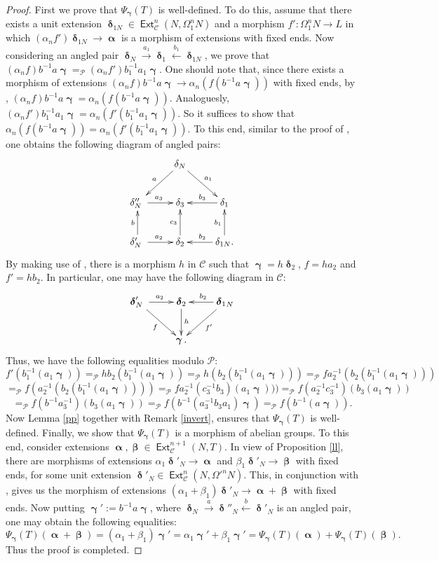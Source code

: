 \documentclass[11pt,a4paper]{amsart}
\newcommand{\rt}{\rightarrow}
\newcommand{\lrt}{\longrightarrow}
\newcommand{\lf}{\leftarrow}
\newcommand{\st}{\stackrel}
\newcommand{\C}{\mathscr{C} }
\newcommand{\p}{\mathfrak{p} }
\def\Ext{\operatorname{{\mathsf{Ext}}}}
\def\syz{\mathsf{\Omega}}
\def\p{\mathcal P}
\def\al{\operatorname{\boldsymbol{\alpha}}}
\def\be{\operatorname{\boldsymbol{\beta}}}
\def\ga{\operatorname{\boldsymbol{\gamma}}}
\def\de{\operatorname{\boldsymbol{\delta}}}
\theoremstyle{definition}
\theoremstyle{plain}
\theoremstyle{definition}
\numberwithin{equation}{section}
\begin{document}
\begin{proof}First we prove that $\Psi_{\ga}(T)$ is well-defined. To do this, assume that there exists a unit extension $\de_{1N}\in\Ext^n_{\C}(N, \syz^n_1N)$ and a morphism $f':\syz^n_1N\rt L$ in which $(\alpha_nf')\de_{1N}\lrt\al$ is a morphism of extensions with fixed ends. Now considering an angled pair $\de_N\st{a_1}\rt\de_1\st{b_1}\lf\de_{1N}$, we prove that $(\alpha_nf)b^{-1}a\ga=_{\p}(\alpha_nf')b_1^{-1}a_1\ga$. One should note that, since there exists a morphism of extensions $(\alpha_nf)b^{-1}a\ga\lrt\alpha_n(f(b^{-1}a\ga))$ with fixed ends, by \cite[Chapter VII, Proposition 3.1]{mit}, $(\alpha_nf)b^{-1}a\ga=\alpha_n(f(b^{-1}a\ga))$. Analoguesly,  $(\alpha_nf')b_1^{-1}a_1\ga=\alpha_n(f'(b_1^{-1}a_1\ga))$. So it suffices to show that  $\alpha_n(f(b^{-1}a\ga))=\alpha_n(f'(b_1^{-1}a_1\ga))$. To this end, similar to the proof of  \cite[Theorem 7.4]{bfss}, one obtains the following diagram of angled pairs:
{\footnotesize \[\xymatrix{&\delta_N\ar[dl]_{a}\ar[dr]^{a_1}& \\ \delta''_{N}~\ar[r]^{a_3}& \delta_3& \delta_1\ar[l]_{b_3}\\ \delta'_{N}\ar[u]^{b}\ar[r]^{a_2}~ & \delta_2\ar[u]^{c_3} & \delta_{1N}\ar[l]_{b_2}\ar[u]^{b_1}.}\]}By making use of \cite[Proposition 5.8]{bfss}, there is a morphism $h$ in $\C$ such that $\ga=h\de_2$, $f=ha_2$ and $f'=hb_2$. In particular, one may have the following diagram in $\C$: {\footnotesize\[\xymatrix{\de'_N~ \ar[r]^{a_2}\ar[rd]_{f}& \de_2\ar[d]^{h}& {\de_1}_{N}\ar[l]_{b_2}\ar[ld]^{f'}\\ & \ga .& }\]}
Thus, we have the following equalities modulo $\p$: $$f'(b_1^{-1}(a_1\ga))=_{\p}hb_2(b_1^{-1}(a_1\ga))=_{\p}h(b_2(b_1^{-1}(a_1\ga)))=_{\p}fa_2^{-1}(b_2(b_1^{-1}(a_1\ga)))$$ $$=_{\p}f(a_2^{-1}(b_2(b_1^{-1}(a_1\ga))))=_{\p} fa_2^{-1}(c_3^{-1}b_3)(a_1\ga)))=_{\p}f(a_2^{-1}c_3^{-1})(b_3(a_1\ga))$$$$=_{\p}f(b^{-1}a_3^{-1})(b_3(a_1\ga))=_{\p}f(b^{-1}(a_3^{-1}b_3a_1)\ga)=_{\p}f(b^{-1}(a\ga)).$$Now Lemma \ref{pp} together with Remark \ref{invert}, ensures that $\Psi_{\ga}(T)$ is well-defined.
Finally, we show that $\Psi_{\ga}(T)$ is a morphism of abelian groups. To this end, consider extensions $\al, \be\in\Ext^{n+1}_{\C}(N, T)$. In view of Proposition \ref{ll}, there are morphisms of extensions $\alpha_1\de'_N\lrt\al$ and $\beta_1\de'_N\lrt\be$ with fixed ends, for some unit extension $\de'_N\in\Ext^n_{\C}(N, {\syz'}^nN)$. This, in conjunction with \cite[Chapter VII, Lemma 3.2]{mit}, gives us the morphism of extensions $(\alpha_1+\beta_1)\de'_N\lrt\al+\be$ with fixed ends. Now putting $\ga':=b^{-1}a\ga$, where $\de_N\st{a}\rt\de''_N\st{b}\lf\de'_N$ is an angled pair, one may obtain the following equalities:
$$\Psi_{\ga}(T)(\al+\be)=(\alpha_1+\beta_1)\ga'=\alpha_1\ga'+\beta_1\ga'=\Psi_{\ga}(T)(\al)+\Psi_{\ga}(T)(\be).$$Thus the proof is completed.
\end{proof}
\end{document}
